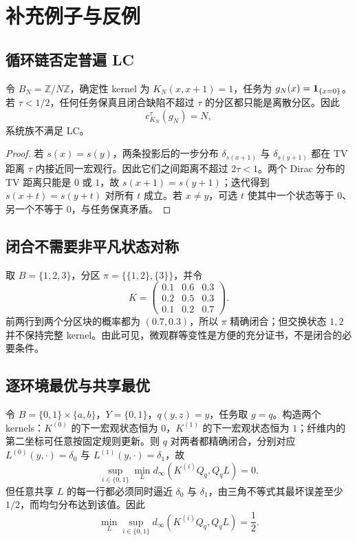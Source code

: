 \section{补充例子与反例}
\label{app:examples-counterexamples}

\subsection{循环链否定普遍 LC}

\begin{counterexample}[有限性不推出低复杂度]
\label{counter:cycle}
令 $B_N=\mathbb Z/N\mathbb Z$，确定性 kernel 为
$K_N(x,x+1)=1$，任务为 $g_N(x)=\mathbf 1_{\{x=0\}}$。若 $\tau<1/2$，任何任务保真且闭合缺陷不超过 $\tau$ 的分区都只能是离散分区。因此
\[
c_{K_N}^{\tau}(g_N)=N,
\]
系统族不满足 LC。
\end{counterexample}

\begin{proof}
若 $s(x)=s(y)$，两条投影后的一步分布 $\delta_{s(x+1)}$ 与 $\delta_{s(y+1)}$ 都在 TV 距离 $\tau$ 内接近同一宏观行。因此它们之间距离不超过 $2\tau<1$。两个 Dirac 分布的 TV 距离只能是 $0$ 或 $1$，故 $s(x+1)=s(y+1)$；迭代得到 $s(x+t)=s(y+t)$ 对所有 $t$ 成立。若 $x\ne y$，可选 $t$ 使其中一个状态等于 $0$、另一个不等于 $0$，与任务保真矛盾。
\end{proof}

\subsection{闭合不需要非平凡状态对称}

\begin{example}[无交换对称的闭合商]
取 $B=\{1,2,3\}$，分区 $\pi=\{\{1,2\},\{3\}\}$，并令
\[
K=\begin{pmatrix}
0.1&0.6&0.3\\
0.2&0.5&0.3\\
0.1&0.2&0.7
\end{pmatrix}.
\]
前两行到两个分区块的概率都为 $(0.7,0.3)$，所以 $\pi$ 精确闭合；但交换状态 $1,2$ 并不保持完整 kernel。由此可见，微观群等变性是方便的充分证书，不是闭合的必要条件。
\end{example}

\subsection{逐环境最优与共享最优}

\begin{counterexample}[逐环境规律不等于共享规律]
令 $B=\{0,1\}\times\{a,b\}$，$Y=\{0,1\}$，$q(y,z)=y$，任务取 $g=q$。构造两个 kernels：$K^{(0)}$ 的下一宏观状态恒为 $0$，$K^{(1)}$ 的下一宏观状态恒为 $1$；纤维内的第二坐标可任意按固定规则更新。则 $q$ 对两者都精确闭合，分别对应
$L^{(0)}(y,\cdot)=\delta_0$ 与 $L^{(1)}(y,\cdot)=\delta_1$，故
\[
\sup_{i\in\{0,1\}}\min_L
d_\infty(K^{(i)}Q_q,Q_qL)=0.
\]
但任意共享 $L$ 的每一行都必须同时逼近 $\delta_0$ 与 $\delta_1$，由三角不等式其最坏误差至少 $1/2$，而均匀分布达到该值。因此
\[
\min_L\sup_{i\in\{0,1\}}
d_\infty(K^{(i)}Q_q,Q_qL)=\frac12.
\]
\end{counterexample}

